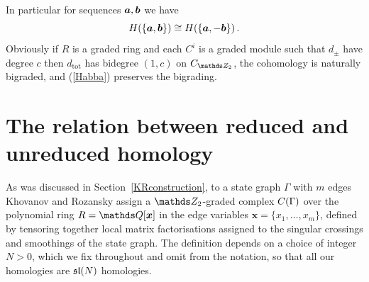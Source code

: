 \documentclass{compositio}
\theoremstyle{definition}
\numberwithin{equation}{section}
\begin{document}
In particular for sequences $\boldsymbol{a}, \boldsymbol{b}$ we have
\begin{equation}
\label{Habba}
H(\{ \boldsymbol{a}, \boldsymbol{b} \}) \cong H(\{\boldsymbol{a}, -\boldsymbol{b}\}) \, .
\end{equation}
Obviously if $R$ is a graded ring and each $C^i$ is a graded module such that $d_{\pm}$ have degree $c$ then $d_{\text{tot}}$ has bidegree $(1,c)$ on $C_{\Ztwo}$, the cohomology is naturally bigraded, and (\ref{Habba}) preserves the bigrading.
%

\section{The relation between reduced and unreduced homology}
\label{relationReducedUnreduced}

As was discussed in Section~\ref{KRconstruction}, to a state graph $\Gamma$ with $m$ edges Khovanov and Rozansky assign a $\Ztwo$-graded complex $C(\Gamma)$ over the polynomial ring $R = \QQ[\boldsymbol{x}]$ in the edge variables $\boldsymbol{x} = \{x_1,\ldots,x_m\}$, defined by tensoring together local matrix factorisations assigned to the singular crossings and smoothings of the state graph. The definition depends on a choice of integer $N > 0$, which we fix throughout and omit from the notation, so that all our homologies are $\mathfrak{sl}(N)$ homologies.
\end{document}
